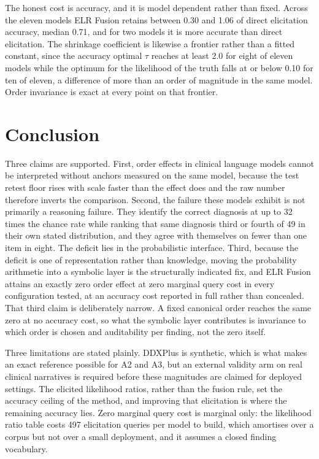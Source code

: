 \documentclass[10pt]{article}
\begin{document}
The honest cost is accuracy, and it is model dependent rather than fixed. Across the eleven models
ELR Fusion retains between 0.30 and 1.06 of direct elicitation accuracy, median 0.71, and for two
models it is more accurate than direct elicitation. The shrinkage coefficient is likewise a frontier
rather than a fitted constant, since the accuracy optimal $\tau$ reaches at least 2.0 for eight of eleven
models while the optimum for the likelihood of the truth falls at or below 0.10 for ten of eleven,
a difference of more than an order of magnitude in the same model. Order invariance is exact at every
point on that frontier.

\section{Conclusion}
Three claims are supported. First, order effects in clinical language models cannot be interpreted
without anchors measured on the same model, because the test retest floor rises with scale faster
than the effect does and the raw number therefore inverts the comparison. Second, the failure these
models exhibit is not primarily a reasoning failure. They identify the correct diagnosis at up to 32
times the chance rate while ranking that same diagnosis third or fourth of 49 in their own stated
distribution, and they agree with themselves on fewer than one item in eight. The deficit lies in the
probabilistic interface. Third, because the deficit is one of representation rather than knowledge,
moving the probability arithmetic into a symbolic layer is the structurally indicated fix, and ELR
Fusion attains an exactly zero order effect at zero marginal query cost in every configuration
tested, at an accuracy cost reported in full rather than concealed. That third claim is deliberately
narrow. A fixed canonical order reaches the same zero at no accuracy cost, so what the symbolic
layer contributes is invariance to which order is chosen and auditability per finding, not the zero
itself.

Three limitations are stated plainly. DDXPlus is synthetic, which is what makes an exact reference
possible for A2 and A3, but an external validity arm on real clinical narratives is required before
these magnitudes are claimed for deployed settings. The elicited likelihood ratios, rather than the
fusion rule, set the accuracy ceiling of the method, and improving that elicitation is where the
remaining accuracy lies. Zero marginal query cost is marginal only: the likelihood ratio table costs
497 elicitation queries per model to build, which amortises over a corpus but not over a small
deployment, and it assumes a closed finding vocabulary.
\end{document}
